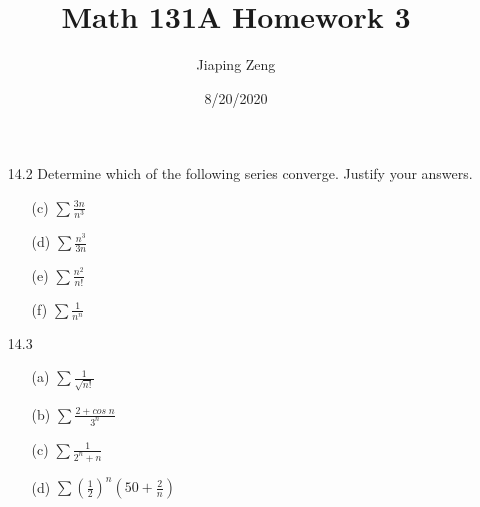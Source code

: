 \documentclass{article}
\title{Math 131A Homework 3}
\date{8/20/2020}
\author{Jiaping Zeng}
\begin{document}
\maketitle

\begin{itemize}
    \item [14.2] Determine which of the following series converge. Justify your answers.
          \begin{itemize}
              \item [(c)] $\sum\frac{3n}{n^3}$
              \item [(d)] $\sum\frac{n^3}{3n}$
              \item [(e)] $\sum\frac{n^2}{n!}$
              \item [(f)] $\sum\frac{1}{n^n}$
          \end{itemize}
    \item [14.3]
          \begin{itemize}
              \item [(a)] $\sum\frac{1}{\sqrt{n!}}$
              \item [(b)] $\sum\frac{2+cos\;n}{3^n}$
              \item [(c)] $\sum\frac{1}{2^n+n}$
              \item [(d)] $\sum(\frac{1}{2})^n(50+\frac{2}{n})$
          \end{itemize}
\end{itemize}
\end{document}
